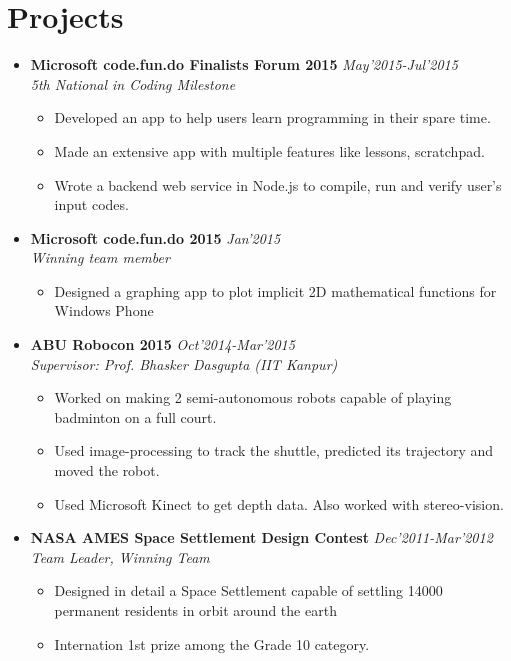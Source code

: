 \documentclass[11pt,a4paper]{article}
\begin{document}
\section*{Projects}
\begin {itemize}

\item \textbf{\large{Microsoft code.fun.do Finalists Forum 2015}} \hfill\textit{ May'2015-Jul'2015}\\ \emph{5th National in Coding Milestone}
    \begin{itemize}
    \setlength \itemsep{0em}
    \item Developed an app to help users learn programming in their spare time.
    \item Made an extensive app with multiple features like lessons, scratchpad.
    \item Wrote a backend web service in Node.js to compile, run and verify user's input codes.
\\
    \end{itemize}

\item \textbf{\large{Microsoft code.fun.do 2015}} \hfill\textit{ Jan'2015}\\ \emph{Winning team member}
    \begin{itemize}
    \setlength \itemsep{0em}
    \item Designed a graphing app to plot implicit 2D mathematical functions for Windows Phone
\\
    \end{itemize}

\item \textbf{\large{ABU Robocon 2015}} \hfill\textit{ Oct'2014-Mar'2015}\\ \emph{Supervisor: Prof. Bhasker Dasgupta (IIT Kanpur)}
    \begin{itemize}
    \setlength \itemsep{0em}
    \item Worked on making 2 semi-autonomous robots capable of playing badminton on a full court.
    \item Used image-processing to track the shuttle, predicted its trajectory and moved the robot.
    \item Used Microsoft Kinect to get depth data. Also worked with stereo-vision.
\\
    \end{itemize}

\item \textbf{\large{NASA AMES Space Settlement Design Contest}} \hfill\textit{ Dec'2011-Mar'2012}\\ \emph{Team Leader, Winning Team}
    \begin{itemize}
    \setlength \itemsep{0em}
    \item Designed in detail a Space Settlement capable of settling 14000 permanent residents in orbit around the earth
    \item Internation 1st prize among the Grade 10 category.
\\
    \end{itemize}


\end{itemize}
\end{document}
